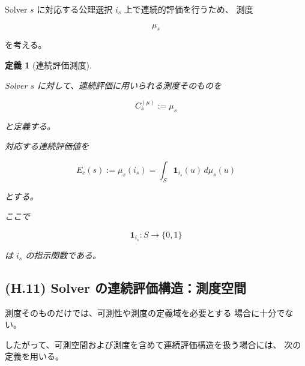 \documentclass[a4paper,11pt]{article}
\newtheorem{definition}{定義}[section]
\begin{document}
Solver $s$ に対応する公理選択 $i_s$ 上で連続的評価を行うため、
測度

\begin{equation}
    \mu_s
\end{equation}

を考える。

\begin{definition}[連続評価測度]
\label{def:H-continuous-measure}

Solver $s$ に対して、連続評価に用いられる測度そのものを

\begin{equation}
    \boxed{
        C_s^{(\mu)}
        :=
        \mu_s
    }
    \label{eq:H-Cs-measure}
\end{equation}

と定義する。

対応する連続評価値を

\begin{equation}
    \boxed{
        E_{\mathrm c}(s)
        :=
        \mu_s(i_s)
        =
        \int_S
        \mathbf 1_{i_s}(u)
        \,d\mu_s(u)
    }
    \label{eq:H-continuous-evaluation}
\end{equation}

とする。

ここで

\begin{equation}
    \mathbf1_{i_s}:S\to\{0,1\}
\end{equation}

は $i_s$ の指示関数である。
\end{definition}


\subsection{(H.11) Solver の連続評価構造：測度空間}
\label{subsec:H11}

測度そのものだけでは、可測性や測度の定義域を必要とする
場合に十分でない。

したがって、可測空間および測度を含めて連続評価構造を扱う場合には、
次の定義を用いる。
\end{document}
